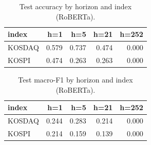 \begin{table}[t]\centering
\caption{Test accuracy by horizon and index (RoBERTa).}
\begin{tabular}{lrrrr}
\toprule
index & h=1 & h=5 & h=21 & h=252 \\
\midrule
KOSDAQ & 0.579 & 0.737 & 0.474 & 0.000 \\
KOSPI & 0.474 & 0.263 & 0.263 & 0.000 \\
\bottomrule
\end{tabular}
\end{table}

\begin{table}[t]\centering
\caption{Test macro-F1 by horizon and index (RoBERTa).}
\begin{tabular}{lrrrr}
\toprule
index & h=1 & h=5 & h=21 & h=252 \\
\midrule
KOSDAQ & 0.244 & 0.283 & 0.214 & 0.000 \\
KOSPI & 0.214 & 0.159 & 0.139 & 0.000 \\
\bottomrule
\end{tabular}
\end{table}
